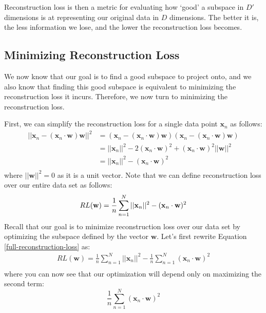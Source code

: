 Reconstruction loss is then a metric for evaluating how `good' a subspace in $D'$ dimensions is at representing our original data in $D$ dimensions. The better it is, the less information we lose, and the lower the reconstruction loss becomes.

\subsection{Minimizing Reconstruction Loss}
We now know that our goal is to find a good subspace to project onto, and we also know that finding this good subspace is equivalent to minimizing the reconstruction loss it incurs. Therefore, we now turn to minimizing the reconstruction loss.

First, we can simplify the reconstruction loss for a single data point $\textbf{x}_n$ as follows:
\begin{align*}
	||\textbf{x}_{n} - (\textbf{x}_{n} \cdot \textbf{w})\textbf{w}||^{2} &= (\textbf{x}_{n} - (\textbf{x}_{n} \cdot \textbf{w})\textbf{w})(\textbf{x}_{n} - (\textbf{x}_{n} \cdot \textbf{w})\textbf{w}) \\
	&= ||\textbf{x}_{n}||^{2} - 2(\textbf{x}_{n} \cdot \textbf{w})^{2} + (\textbf{x}_{n} \cdot \textbf{w})^{2}||\textbf{w}||^{2} \\
	&= ||\textbf{x}_{n}||^{2} - (\textbf{x}_{n} \cdot \textbf{w})^{2} \\
\end{align*}
where $||\textbf{w}||^{2} = 0$ as it is a unit vector. Note that we can define reconstruction loss over our entire data set as follows:
\begin{equation} \label{full-reconstruction-loss}
    RL(\textbf{w}) = \frac{1}{n} \sum_{n=1}^{N} ||\textbf{x}_{n}||^{2} - (\textbf{x}_{n} \cdot \textbf{w})^{2} \\
\end{equation}
Recall that our goal is to minimize reconstruction loss over our data set by optimizing the subspace defined by the vector $\textbf{w}$. Let's first rewrite Equation \ref{full-reconstruction-loss} as:
\begin{align*}
    RL(\textbf{w}) = \frac{1}{n} \sum_{n=1}^{N} ||\textbf{x}_{n}||^{2} - \frac{1}{n} \sum_{n=1}^{N} (\textbf{x}_{n} \cdot \textbf{w})^{2} \\
\end{align*}
where you can now see that our optimization will depend only on maximizing the second term:
\begin{equation} \label{max-for-recon-loss}
    \frac{1}{n} \sum_{n=1}^{N} (\textbf{x}_{n} \cdot \textbf{w})^{2}
\end{equation}
